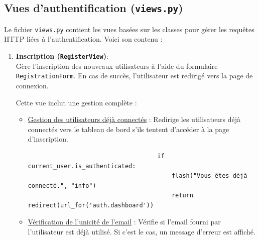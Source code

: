 \documentclass[a4paper,11pt]{article}
\begin{document}
            \subsection{Vues d'authentification (\texttt{views.py})}
                \noindent Le fichier \texttt{views.py} contient les vues basées sur les classes pour gérer les requêtes HTTP liées à l'authentification. Voici son contenu :

                

                \begin{enumerate}
                    \item \textbf{Inscription (\texttt{RegisterView})}:\\
                        \noindent Gère l'inscription des nouveaux utilisateurs à l'aide du formulaire \texttt{RegistrationForm}. En cas de succès, l'utilisateur est redirigé vers la page de connexion.

                        \noindent Cette vue inclut une gestion complète :

                        \begin{itemize}
                            \item \underline{Gestion des utilisateurs déjà connectés} : Redirige les utilisateurs déjà connectés vers le tableau de bord s'ils tentent d'accéder à la page d'inscription.

                            \begin{tcolorbox}[colback=lightgray!6, colframe=black, left=-60mm, right=5mm, top=2mm, bottom=0mm, boxrule=0.1mm]
                                \begin{verbatim}
                                    if current_user.is_authenticated:
                                        flash("Vous êtes déjà connecté.", "info")
                                        return redirect(url_for('auth.dashboard'))
                                \end{verbatim}
                            \end{tcolorbox}

                            \item \underline{Vérification de l'unicité de l'email} : Vérifie si l'email fourni par l'utilisateur est déjà utilisé. Si c'est le cas, un message d'erreur est affiché.


\end{itemize}
\end{enumerate}
\end{document}
